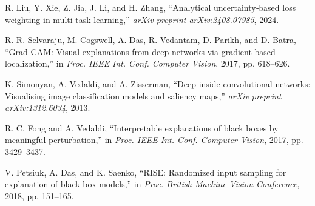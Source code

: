 \documentclass{ELSP}
\begin{document}
\begin{thebibliography}{99}
R. Liu, Y. Xie, Z. Jia, J. Li, and H. Zhang, ``Analytical uncertainty‑based loss weighting in multi‑task learning,'' \textit{arXiv preprint arXiv:2408.07985}, 2024.

R. R. Selvaraju, M. Cogswell, A. Das, R. Vedantam, D. Parikh, and D. Batra, ``Grad‑CAM: Visual explanations from deep networks via gradient‑based localization,'' in \textit{Proc. IEEE Int. Conf. Computer Vision}, 2017, pp. 618--626.

K. Simonyan, A. Vedaldi, and A. Zisserman, ``Deep inside convolutional networks: Visualising image classification models and saliency maps,'' \textit{arXiv preprint arXiv:1312.6034}, 2013.

R. C. Fong and A. Vedaldi, ``Interpretable explanations of black boxes by meaningful perturbation,'' in \textit{Proc. IEEE Int. Conf. Computer Vision}, 2017, pp. 3429--3437.

V. Petsiuk, A. Das, and K. Saenko, ``RISE: Randomized input sampling for explanation of black‑box models,'' in \textit{Proc. British Machine Vision Conference}, 2018, pp. 151--165.

\end{thebibliography}
\end{document}
